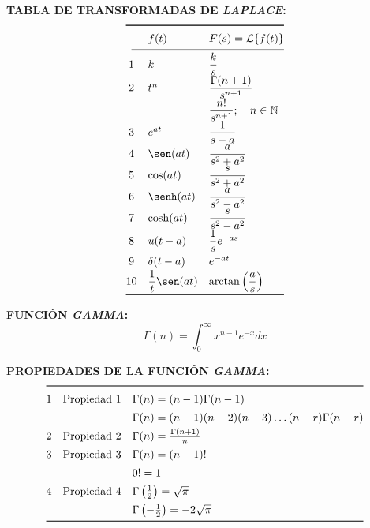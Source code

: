 \documentclass[letter,twoside,8pt]{article}
\begin{document}
\textbf{TABLA DE TRANSFORMADAS DE \emph{LAPLACE}:}
\begin{equation*}
\def\arraystretch{1.4}
\begin{array}{@{}cll@{}}
\toprule
 & f(t) & F(s)=\mathcal{L}\{f(t)\}\\
\cmidrule(l){1-3}
 1 & k
   & \dfrac{k}{s}\\
 2 & t^n
   & \dfrac{\Gamma(n+1)}{s^{n+1}}\\
   &
   & \dfrac{n!}{s^{n+1}};\quad{n}\in\mathbb{N}\\
 3 & e^{at}
   & \dfrac{1}{s-a}\\
 4 & \sen(at)
   & \dfrac{a}{s^2+a^2}\\
 5 & \cos(at)
   & \dfrac{s}{s^2+a^2}\\
 6 & \senh(at)
   & \dfrac{a}{s^2-a^2}\\
 7 & \cosh(at)
   & \dfrac{s}{s^2-a^2}\\
 8 & u(t-a)
   & \dfrac{1}{s}e^{-as}\\
 9 & \delta(t-a)
   & e^{-at}\\
10 & \dfrac{1}{t}\sen(at)
   & \arctan\left(\dfrac{a}{s}\right)\\
\bottomrule
\end{array}
\end{equation*}

\textbf{FUNCIÓN \emph{GAMMA}:}
\begin{equation*}
    \Gamma(n)=\int_0^{\infty}x^{n-1}e^{-x}{dx}
\end{equation*}

\textbf{PROPIEDADES DE LA FUNCIÓN \emph{GAMMA}:}
\begin{equation*}
\def\arraystretch{1.4}
\begin{array}{@{}cll@{}}
\toprule
 1 & \text{Propiedad 1}
   & \Gamma(n)=(n-1)\Gamma(n-1)\\
   &
   & \Gamma(n)=(n-1)(n-2)(n-3)\dots(n-r)\Gamma(n-r)\\
 2 & \text{Propiedad 2}
   & \Gamma(n)=\frac{\Gamma(n+1)}{n}\\
 3 & \text{Propiedad 3}
   & \Gamma(n)=(n-1)!\\
   &
   & 0!=1\\
 4 & \text{Propiedad 4}
   & \Gamma\left(\frac{1}{2}\right)=\sqrt{\pi}\\
   &
   & \Gamma\left(-\frac{1}{2}\right)=-2\sqrt{\pi}\\
\bottomrule
\end{array}
\end{equation*}
\end{document}
